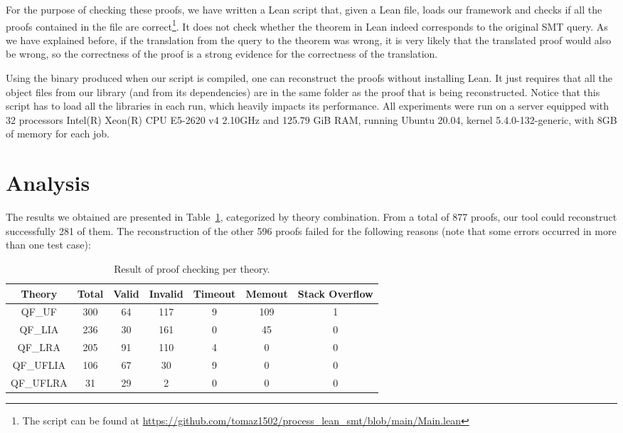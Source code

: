 For the purpose of checking these proofs, we have written a Lean script that, given
a Lean file, loads our framework and checks if all the proofs contained in the file
are correct\footnote{The script can
  be found at \url{https://github.com/tomaz1502/process_lean_smt/blob/main/Main.lean}}.
%
It does not check whether the theorem in Lean indeed corresponds to the original SMT query.
%
As we have explained before, if the translation from the query to the theorem was wrong,
it is very likely that the translated proof would also be wrong, so the correctness
of the proof is a strong evidence for the correctness of the translation.

Using the binary produced when our script is compiled, one can reconstruct the
proofs without installing Lean.
%
It just requires that all the object files from our library (and from its dependencies)
are in the same folder as the proof that is being reconstructed.
%
Notice that this script has to load all the libraries in each run, which heavily impacts
its performance.
%
All experiments were run on a server equipped with 32 processors Intel(R) Xeon(R)
CPU E5-2620 v4 2.10GHz and 125.79 GiB RAM, running Ubuntu 20.04,
kernel 5.4.0-132-generic, with 8GB of memory for each job.

\section{Analysis}

The results we obtained are presented in Table~\ref{results_rcons}, categorized
by theory combination. From a total of 877 proofs, our tool could reconstruct
successfully 281 of them. The reconstruction of the other 596 proofs
failed for the following reasons (note that some errors occurred in more than one test case):

\begin{table}[t]
\centering
\begin{tabular}{ c c c c c c c }
\toprule
Theory  & Total & Valid & Invalid & Timeout & Memout & Stack Overflow \\ \midrule
QF\_UF    & 300   & 64    & 117     & 9       & 109    & 1 \\ \midrule
QF\_LIA   & 236   & 30    & 161     & 0       & 45     & 0 \\ \midrule
QF\_LRA   & 205   & 91    & 110     & 4       & 0      & 0 \\ \midrule
QF\_UFLIA & 106   & 67    & 30      & 9       & 0      & 0  \\ \midrule
QF\_UFLRA & 31    & 29    & 2       & 0       & 0      & 0 \\ \bottomrule
\end{tabular}
\caption{Result of proof checking per theory.}\label{results_rcons}
\end{table}

